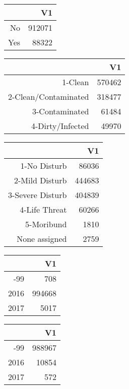 \bigskip\bigskip
\centering
\begin{tabular}{rr}
  \hline
 & V1 \\ 
  \hline
No & 912071 \\ 
  Yes & 88322 \\ 
   \hline
\end{tabular}

\bigskip\bigskip
\centering
\begin{tabular}{rr}
  \hline
 & V1 \\ 
  \hline
1-Clean & 570462 \\ 
  2-Clean/Contaminated & 318477 \\ 
  3-Contaminated & 61484 \\ 
  4-Dirty/Infected & 49970 \\ 
   \hline
\end{tabular}

\bigskip\bigskip
\centering
\begin{tabular}{rr}
  \hline
 & V1 \\ 
  \hline
1-No Disturb & 86036 \\ 
  2-Mild Disturb & 444683 \\ 
  3-Severe Disturb & 404839 \\ 
  4-Life Threat & 60266 \\ 
  5-Moribund & 1810 \\ 
  None assigned & 2759 \\ 
   \hline
\end{tabular}

\bigskip\bigskip
\centering
\begin{tabular}{rr}
  \hline
 & V1 \\ 
  \hline
-99 & 708 \\ 
  2016 & 994668 \\ 
  2017 & 5017 \\ 
   \hline
\end{tabular}

\bigskip\bigskip
\centering
\begin{tabular}{rr}
  \hline
 & V1 \\ 
  \hline
-99 & 988967 \\ 
  2016 & 10854 \\ 
  2017 & 572 \\ 
   \hline
\end{tabular}

